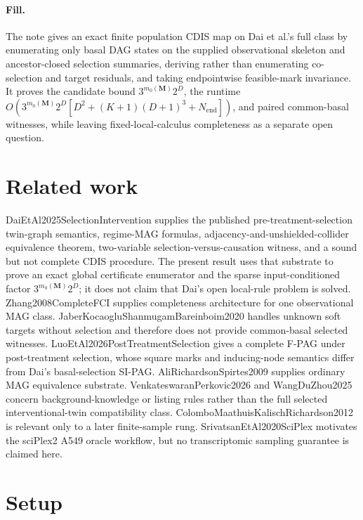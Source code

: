 \documentclass{article}
\begin{document}
\paragraph{Fill.} The note gives an exact finite population CDIS map on Dai et al.'s full class by enumerating only basal DAG states on the supplied observational skeleton and ancestor-closed selection summaries, deriving rather than enumerating co-selection and target residuals, and taking endpointwise feasible-mark invariance.  It proves the candidate bound \(3^{m_0(\mathbf M)}2^D\), the runtime \(O(3^{m_0(\mathbf M)}2^D[D^2+(K+1)(D+1)^3+N_{\mathrm{end}}])\), and paired common-basal witnesses, while leaving fixed-local-calculus completeness as a separate open question.

\section{Related work}

DaiEtAl2025SelectionIntervention supplies the published pre-treatment-selection twin-graph semantics, regime-MAG formulas, adjacency-and-unshielded-collider equivalence theorem, two-variable selection-versus-causation witness, and a sound but not complete CDIS procedure.  The present result uses that substrate to prove an exact global certificate enumerator and the sparse input-conditioned factor \(3^{m_0(\mathbf M)}2^D\); it does not claim that Dai's open local-rule problem is solved.  Zhang2008CompleteFCI supplies completeness architecture for one observational MAG class.  JaberKocaogluShanmugamBareinboim2020 handles unknown soft targets without selection and therefore does not provide common-basal selected witnesses.  LuoEtAl2026PostTreatmentSelection gives a complete F-PAG under post-treatment selection, whose square marks and inducing-node semantics differ from Dai's basal-selection SI-PAG.  AliRichardsonSpirtes2009 supplies ordinary MAG equivalence substrate.  VenkateswaranPerkovic2026 and WangDuZhou2025 concern background-knowledge or listing rules rather than the full selected interventional-twin compatibility class.  ColomboMaathuisKalischRichardson2012 is relevant only to a later finite-sample rung.  SrivatsanEtAl2020SciPlex motivates the sciPlex2 A549 oracle workflow, but no transcriptomic sampling guarantee is claimed here.

\section{Setup}
\end{document}
